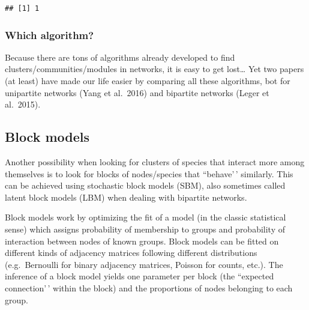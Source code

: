 \documentclass[
]{book}
\newenvironment{Shaded}{\begin{snugshade}}{\end{snugshade}}
\newcommand{\AttributeTok}[1]{\textcolor[rgb]{0.13,0.29,0.53}{#1}}
\newcommand{\DecValTok}[1]{\textcolor[rgb]{0.00,0.00,0.81}{#1}}
\newcommand{\FloatTok}[1]{\textcolor[rgb]{0.00,0.00,0.81}{#1}}
\newcommand{\FunctionTok}[1]{\textcolor[rgb]{0.13,0.29,0.53}{\textbf{#1}}}
\newcommand{\NormalTok}[1]{#1}
\newcommand{\OtherTok}[1]{\textcolor[rgb]{0.56,0.35,0.01}{#1}}
\newcommand{\SpecialCharTok}[1]{\textcolor[rgb]{0.81,0.36,0.00}{\textbf{#1}}}
\newcommand{\StringTok}[1]{\textcolor[rgb]{0.31,0.60,0.02}{#1}}
\theoremstyle{definition}
\theoremstyle{definition}
\theoremstyle{definition}
\theoremstyle{definition}
\theoremstyle{remark}
\begin{document}
\begin{verbatim}
## [1] 1
\end{verbatim}

\subsubsection{Which algorithm?}\label{which-algorithm}

Because there are tons of algorithms already developed to find clusters/communities/modules in networks, it is easy to get lost\ldots{} Yet two papers (at least) have made our life easier by comparing all these algorithms, bot for unipartite networks (Yang et al.~2016) and bipartite networks (Leger et al.~2015).

\subsection{Block models}\label{block-models}

Another possibility when looking for clusters of species that interact more among themselves is to look for blocks of nodes/species that ``behave'\,' similarly. This can be achieved using stochastic block models (SBM), also sometimes called latent block models (LBM) when dealing with bipartite networks.

Block models work by optimizing the fit of a model (in the classic statistical sense) which assigns probability of membership to groups and probability of interaction between nodes of known groups.
Block models can be fitted on different kinds of adjacency matrices following different distributions (e.g.~Bernoulli for binary adjacency matrices, Poisson for counts, etc.).
The inference of a block model yields one parameter per block (the ``expected connection'\,' within the block) and the proportions of nodes belonging to each group.

\begin{Shaded}
\end{Shaded}
\end{document}
